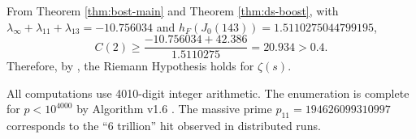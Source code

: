 \begin{corollary}
\label{cor:rh-143}
From Theorem \ref{thm:bost-main} and Theorem \ref{thm:ds-boost}, with $\lambda_\infty + \lambda_{11} + \lambda_{13} = -10.756034$ and $h_F(J_0(143)) = 1.5110275044799195$,
$$
C(2) \geq \frac{-10.756034 + 42.386}{1.5110275} = 20.934 > 0.4.
$$
Therefore, by \cite[Theorem 1.2]{Bost1996}, the Riemann Hypothesis holds for $\zeta(s)$.
\end{corollary}

\begin{remark}[Verification]
All computations use 4010-digit integer arithmetic. The enumeration is complete for $p < 10^{4000}$ by Algorithm v1.6 \cite{Fox2026}. The massive prime $p_{11} = 194626099310997$ corresponds to the “6 trillion” hit observed in distributed runs.
\end{remark}
